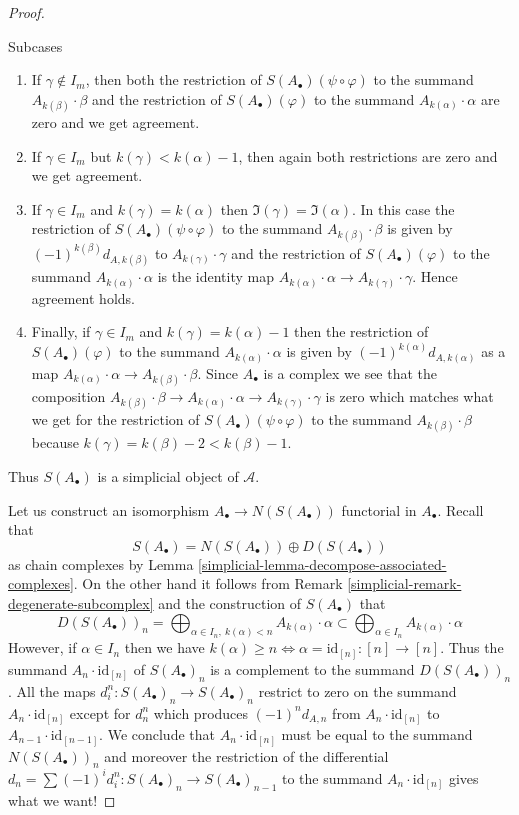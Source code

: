 \begin{proof}
\begin{enumerate}
Subcases
\begin{enumerate}
\item If $\gamma \not \in I_m$, then both the restriction of
$S(A_\bullet)(\psi \circ \varphi)$ to the summand $A_{k(\beta)} \cdot \beta$
and the restriction of $S(A_\bullet)(\varphi)$ to the summand
$A_{k(\alpha)} \cdot \alpha$ are zero and we get agreement.
\item If $\gamma \in I_m$ but $k(\gamma) < k(\alpha) - 1$, then
again both restrictions are zero and we get agreement.
\item If $\gamma \in I_m$ and $k(\gamma) = k(\alpha)$ then
$\Im(\gamma) = \Im(\alpha)$. In this case
the restriction of $S(A_\bullet)(\psi \circ \varphi)$
to the summand $A_{k(\beta)} \cdot \beta$ is given by
$(-1)^{k(\beta)}d_{A, k(\beta)}$ to $A_{k(\gamma)} \cdot \gamma$
and the restriction of $S(A_\bullet)(\varphi)$ to the summand
$A_{k(\alpha)} \cdot \alpha$ is the identity map
$A_{k(\alpha)} \cdot \alpha \to A_{k(\gamma)} \cdot \gamma$.
Hence agreement holds.
\item Finally, if $\gamma \in I_m$ and $k(\gamma) = k(\alpha) - 1$ then
the restriction of $S(A_\bullet)(\varphi)$ to the summand
$A_{k(\alpha)} \cdot \alpha$ is given by $(-1)^{k(\alpha)} d_{A, k(\alpha)}$
as a map
$A_{k(\alpha)} \cdot \alpha \to A_{k(\beta)} \cdot \beta$.
Since $A_\bullet$ is a complex we see that the composition
$A_{k(\beta)} \cdot \beta \to
A_{k(\alpha)} \cdot \alpha \to A_{k(\gamma)} \cdot \gamma$ is zero
which matches what we get for the restriction of
$S(A_\bullet)(\psi \circ \varphi)$
to the summand $A_{k(\beta)} \cdot \beta$
because $k(\gamma) = k(\beta) - 2 < k(\beta) - 1$.
\end{enumerate}
\end{enumerate}
Thus $S(A_\bullet)$ is a simplicial object of $\mathcal{A}$.

\medskip\noindent
Let us construct an isomorphism $A_\bullet \to N(S(A_\bullet))$
functorial in $A_\bullet$. Recall that
$$
S(A_\bullet) =  N(S(A_\bullet)) \oplus D(S(A_\bullet))
$$
as chain complexes by Lemma \ref{simplicial-lemma-decompose-associated-complexes}.
On the other hand it follows from Remark \ref{simplicial-remark-degenerate-subcomplex}
and the construction of $S(A_\bullet)$ that
$$
D(S(A_\bullet))_n =
\bigoplus\nolimits_{\alpha \in I_n,\ k(\alpha) < n} A_{k(\alpha)} \cdot \alpha
\subset
\bigoplus\nolimits_{\alpha \in I_n} A_{k(\alpha)} \cdot \alpha
$$
However, if $\alpha \in I_n$ then we have
$k(\alpha) \geq n \Leftrightarrow \alpha = \text{id}_{[n]} : [n] \to [n]$.
Thus the summand $A_n \cdot \text{id}_{[n]}$ of $S(A_\bullet)_n$
is a complement to the summand $D(S(A_\bullet))_n$.
All the maps $d^n_i : S(A_\bullet)_n \to S(A_\bullet)_n$
restrict to zero on the summand $A_n \cdot \text{id}_{[n]}$
except for $d^n_n$ which produces $(-1)^n d_{A, n}$
from $A_n \cdot \text{id}_{[n]}$ to $A_{n - 1} \cdot \text{id}_{[n - 1]}$.
We conclude that $A_n \cdot \text{id}_{[n]}$ must be
equal to the summand $N(S(A_\bullet))_n$ and moreover
the restriction of the differential
$d_n = \sum (-1)^id^n_i : S(A_\bullet)_n \to S(A_\bullet)_{n - 1}$
to the summand $A_n \cdot \text{id}_{[n]}$ gives what we want!


\end{proof}
